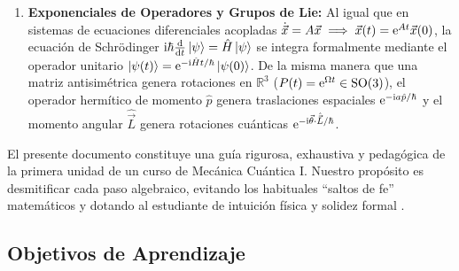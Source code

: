 \begin{enumerate}
    \item \textbf{Exponenciales de Operadores y Grupos de Lie:}
    Al igual que en sistemas de ecuaciones diferenciales acopladas $\dot{\vec{x}} = A\vec{x} \implies \vec{x}(t) = \mathrm{e}^{At}\vec{x}(0)$, la ecuación de Schrödinger $\mathrm{i}\hbar\frac{\mathrm{d}}{\mathrm{d} t}\left| \psi \right\rangle = \hat{H}\left| \psi \right\rangle$ se integra formalmente mediante el operador unitario $\left| \psi(t) \right\rangle = \mathrm{e}^{-\mathrm{i}\hat{H}t/\hbar}\left| \psi(0) \right\rangle$.
    De la misma manera que una matriz antisimétrica genera rotaciones en $\mathbb{R}^3$ ($P(t) = \mathrm{e}^{\Omega t} \in \mathrm{SO}(3)$), el operador hermítico de momento $\hat{p}$ genera traslaciones espaciales $\mathrm{e}^{-\mathrm{i} a\hat{p}/\hbar}$ y el momento angular $\hat{\vec{L}}$ genera rotaciones cuánticas $\mathrm{e}^{-\mathrm{i}\vec{\theta}\cdot\hat{\vec{L}}/\hbar}$.
\end{enumerate}

El presente documento constituye una guía rigurosa, exhaustiva y pedagógica de la primera unidad de un curso de Mecánica Cuántica I. Nuestro propósito es desmitificar cada paso algebraico, evitando los habituales \enquote{saltos de fe} matemáticos y dotando al estudiante de intuición física y solidez formal \cite{zettili, sakurai}.

\subsection{Objetivos de Aprendizaje}

